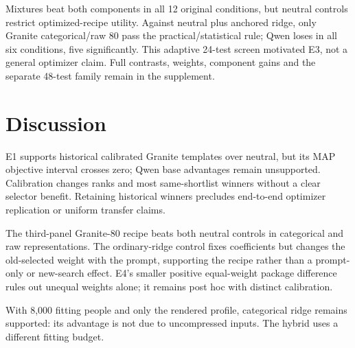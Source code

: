 \documentclass[sigconf,anonymous]{aamas}
\begin{document}
Mixtures beat both components in all 12 original conditions, but neutral
controls restrict optimized-recipe utility. Against neutral plus anchored
ridge, only Granite categorical/raw 80 pass the practical/statistical rule;
Qwen loses in all six conditions, five significantly. This adaptive 24-test
screen motivated E3, not a general optimizer claim. Full contrasts, weights,
component gains and the separate 48-test family remain in the supplement.

\section{Discussion}\label{sec:discussion}
E1 supports historical calibrated Granite templates over neutral, but its MAP
objective interval crosses zero; Qwen base advantages remain unsupported.
Calibration changes ranks and most same-shortlist winners without a clear
selector benefit. Retaining historical winners precludes end-to-end optimizer
replication or uniform transfer claims.

The third-panel Granite-80 recipe beats both neutral controls in categorical
and raw representations. The ordinary-ridge control fixes coefficients but
changes the old-selected weight with the prompt, supporting the recipe rather
than a prompt-only or new-search effect. E4's smaller positive equal-weight
package difference rules out unequal weights alone; it remains post hoc with
distinct calibration.

With 8,000 fitting people and only the rendered profile, categorical ridge
remains supported: its advantage is not due to uncompressed inputs. The hybrid
uses a different fitting budget.
\end{document}
